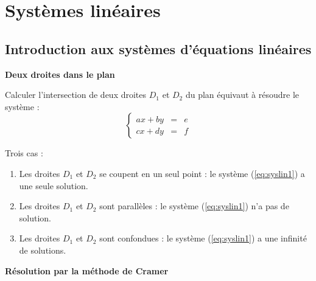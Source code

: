 \documentclass[10pt,class=article,crop=false]{standalone}
\begin{document}
\section{Systèmes linéaires}

\begin{multicols}{2}
	

\subsection{Introduction aux systèmes d'équations linéaires}


\textbf{Deux droites dans le plan}

Calculer l'intersection de deux droites $D_1$ et $D_2$ du plan équivaut à résoudre le système :
\begin{equation}
	\left\{\begin{array}{rcl}
		a x + b y & = & e\\
		c x + d y & = & f
	\end{array}\right.
	\tag{$S$}
	\label{eq:syslin1}
\end{equation}


Trois cas :
\begin{enumerate}
	\item Les droites $D_1$ et $D_2$ se coupent en un seul point :	
	le système (\ref{eq:syslin1}) a une seule solution.
	
	
	\item Les droites $D_1$ et $D_2$ sont parallèles : le système
	(\ref{eq:syslin1}) n'a pas de solution.
	
	
	
	\item Les droites $D_1$ et $D_2$ sont confondues : le système  (\ref{eq:syslin1}) a une infinité de solutions.
\end{enumerate}






\textbf{Résolution par la méthode de Cramer}



\end{multicols}
\end{document}
